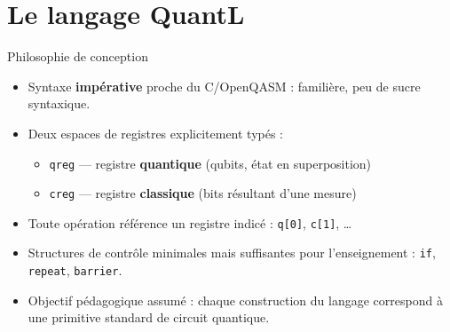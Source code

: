 \documentclass[10pt]{beamer}
\begin{document}
\section{Le langage QuantL}

\begin{frame}{Philosophie de conception}
  \begin{itemize}
    \item Syntaxe \textbf{impérative} proche du C/OpenQASM : familière, peu de sucre syntaxique.
    \item Deux espaces de registres explicitement typés :
    \begin{itemize}
      \item \texttt{qreg} --- registre \textbf{quantique} (qubits, état en superposition)
      \item \texttt{creg} --- registre \textbf{classique} (bits résultant d'une mesure)
    \end{itemize}
    \item Toute opération référence un registre indicé : \texttt{q[0]}, \texttt{c[1]}, \dots
    \item Structures de contrôle minimales mais suffisantes pour l'enseignement : \texttt{if}, \texttt{repeat}, \texttt{barrier}.
    \item Objectif pédagogique assumé : chaque construction du langage correspond à une primitive standard de circuit quantique.
  \end{itemize}
\end{frame}
\end{document}

